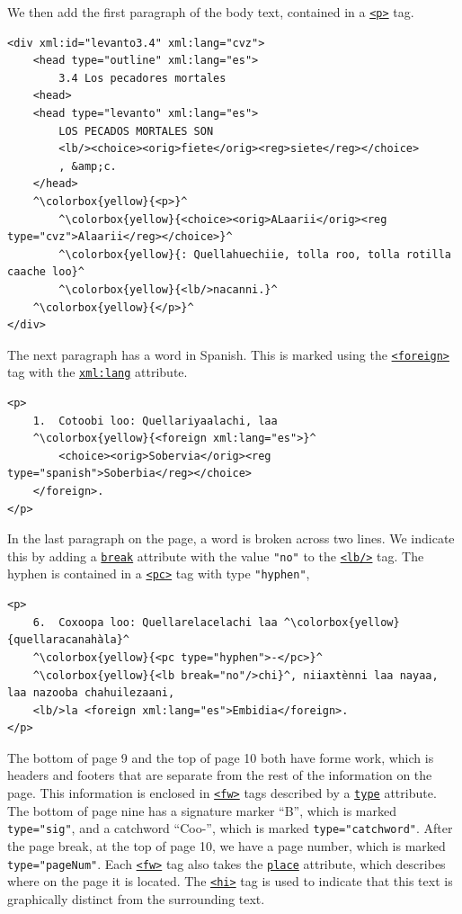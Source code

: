 \documentclass[12pt,a4paper]{article}
\begin{document}
We then add the first paragraph of the body text, contained in a \hyperref[tag-sec:p]{\texttt{<p>}} tag.

\begin{lstlisting}
<div xml:id="levanto3.4" xml:lang="cvz">
	<head type="outline" xml:lang="es">
		3.4 Los pecadores mortales
	<head>
	<head type="levanto" xml:lang="es">
		LOS PECADOS MORTALES SON
		<lb/><choice><orig>fiete</orig><reg>siete</reg></choice>
		, &amp;c.
	</head>
	^\colorbox{yellow}{<p>}^
		^\colorbox{yellow}{<choice><orig>ALaarii</orig><reg type="cvz">Alaarii</reg></choice>}^
		^\colorbox{yellow}{: Quellahuechiie, tolla roo, tolla rotilla caache loo}^
		^\colorbox{yellow}{<lb/>nacanni.}^
	^\colorbox{yellow}{</p>}^
</div>
\end{lstlisting}

The next paragraph has a word in Spanish.  This is marked using the \hyperref[tag-sec:foreign]{\texttt{<foreign>}} tag with the \hyperref[att-sec:xml:lang]{\texttt{xml:lang}} attribute.

\begin{lstlisting}
<p>
	1.  Cotoobi loo: Quellariyaalachi, laa 
	^\colorbox{yellow}{<foreign xml:lang="es">}^
		<choice><orig>Sobervia</orig><reg type="spanish">Soberbia</reg></choice>
	</foreign>.
</p>
\end{lstlisting}

In the last paragraph on the page, a word is broken across two lines.  We indicate this by adding a \hyperref[att-sec:break]{\texttt{break}} attribute with the value \texttt{"no"} to the \hyperref[tag-sec:lb]{\texttt{<lb/>}} tag.  The hyphen is contained in a \hyperref[tag-sec:pc]{\texttt{<pc>}} tag with type \texttt{"hyphen"},

\begin{lstlisting}
<p>
	6.  Coxoopa loo: Quellarelacelachi laa ^\colorbox{yellow}{quellaracanahàla}^
	^\colorbox{yellow}{<pc type="hyphen">-</pc>}^
	^\colorbox{yellow}{<lb break="no"/>chi}^, niiaxtènni laa nayaa, laa nazooba chahuilezaani,
	<lb/>la <foreign xml:lang="es">Embidia</foreign>.
</p>
\end{lstlisting}

The bottom of page 9 and the top of page 10 both have forme work, which is headers and footers that are separate from the rest of the information on the page.  This information is enclosed in \hyperref[tag-sec:fw]{\texttt{<fw>}} tags described by a \hyperref[att-sec:type]{\texttt{type}} attribute.  The bottom of page nine has a signature marker ``B'', which is marked \texttt{type="sig"}, and a catchword ``Coo-'', which is marked \texttt{type="catchword"}.  After the page break, at the top of page 10, we have a page number, which is marked \texttt{type="pageNum"}.  Each \hyperref[tag-sec:fw]{\texttt{<fw>}} tag also takes the \hyperref[att-sec:place]{\texttt{place}} attribute, which describes where on the page it is located.  The \hyperref[tag-sec:hi]{\texttt{<hi>}} tag is used to indicate that this text is graphically distinct from the surrounding text.
\end{document}
